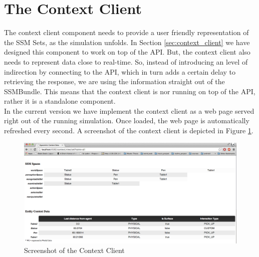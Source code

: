 \section{The Context Client} %
\label{sec:impl_context_client}
The context client component needs to provide a user friendly representation of the SSM Sets, as the simulation unfolds. In Section \ref{sec:context_client} we have designed this component to work on top of the API. But, the context client also needs to represent data close to real-time. So, instead of introducing an level of indirection by connecting to the API, which in turn adds a certain delay to retrieving the response, we are using the information straight out of the SSMBundle. This means that the context client is nor running on top of the API, rather it is a standalone component.\\

In the current version we have implement the context client as a web page served right out of the running simulation. Once loaded, the web page is automatically refreshed every second. A screenshot of the context client is depicted in Figure \ref{fig:impl_context_client}.
\begin{figure}[H]
	\centering
	\includegraphics[width=\linewidth]{gfx/Chapter4/context_client}
	\caption{Screenshot of the Context Client}
	\label{fig:impl_context_client}
\end{figure}

